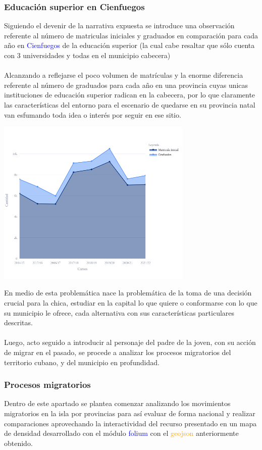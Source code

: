 \documentclass{article}
\begin{document}
\subsubsection{Educación superior en Cienfuegos}
Siguiendo el devenir de la narrativa expuesta se introduce una observación referente al número de matriculas iniciales y graduados en comparación para cada año en \textcolor{blue}{Cienfuegos} de la educación superior (la cual cabe resaltar que sólo cuenta con 3 universidades y todas en el municipio cabecera)\\\\
Alcanzando a reflejarse el poco volumen de matrículas y la enorme diferencia referente al número de graduados para cada año en una provincia cuyas unicas instituciones de educación superior radican en la cabecera, por lo que claramente las características del entorno para el escenario de quedarse en su provincia natal van esfumando toda idea o interés por seguir en ese sitio.
\begin{center}
\includegraphics[width=0.7\textwidth]{img/fig2.png}
\end{center}
En medio de esta problemática nace la problemática de la toma de una decisión crucial para la chica, estudiar en la capital lo que quiere o conformarse con lo que su municipio le ofrece, cada alternativa con sus características particulares descritas.\\\\

Luego, acto seguido a introducir al personaje del padre de la joven, con su acción de migrar en el pasado, se procede a analizar los procesos migratorios del territorio cubano, y del municipio en profundidad.
\subsubsection{Procesos migratorios}
Dentro de este apartado se plantea comenzar analizando los movimientos migratorios en la isla por provincias para así evaluar de forma nacional y realizar comparaciones aprovechando la interactividad del recurso presentado en un mapa de densidad desarrollado con el módulo \textcolor{blue}{folium} con el \textcolor{orange}{geojson} anteriormente obtenido.
\end{document}
